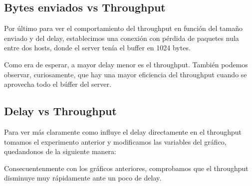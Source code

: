 \subsection{Bytes enviados vs Throughput}
  Por \'ultimo para ver el comportamiento del throughput en funci\'on del tama\~no enviado y del delay, establecimos una conexi\'on con p\'erdida de paquetes nula entre dos hosts, donde el server ten\'ia el buffer en 1024 bytes. 

  
  Como era de esperar, a mayor delay menor es el throughput. Tambi\'en podemos observar, curiosamente, que hay una mayor eficiencia del throughput cuando se aprovecha todo el b\'uffer del server. 
  
\subsection{Delay vs Throughput}
  
  Para ver m\'as claramente como influye el delay directamente en el throughput tomamos el experimento anterior y modificamos las variables del gr\'afico, quedandonos de la siguiente manera: 
  
  
  Consecuentenmente con los gr\'aficos anteriores, comprobamos que el throughput disminuye muy r\'apidamente ante un poco de delay. 